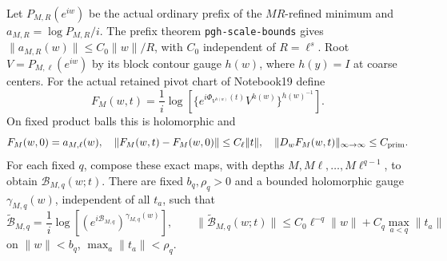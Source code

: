 \begin{proposition}
\label{mrg-block}
Let $P_{M,R}(e^{iw})$ be the actual ordinary prefix of the $MR$-refined
minimum and $a_{M,R}=\log P_{M,R}/i$. The prefix theorem
\texttt{pgh-scale-bounds} gives $\|a_{M,R}(w)\|\le C_0\|w\|/R$,
with $C_0$ independent of $R=\ell^s$.
Root $V=P_{M,\ell}(e^{iw})$ by its block contour gauge $h(w)$,
where $h(y)=I$ at coarse centers. For the actual retained pivot chart
of Notebook19 define
\begin{equation}
 F_M(w,t)=\frac1i\log\left[
       \{e^{i\Phi_{V^{h(w)}}(t)}V^{h(w)}\}^{h(w)^{-1}}\right].
 \label{mrg-chart}
\end{equation}
On fixed product balls this is holomorphic and
\begin{equation}
 F_M(w,0)=a_{M,\ell}(w),\quad
 \|F_M(w,t)-F_M(w,0)\|\le C_\ell\|t\|,\quad
 \|D_wF_M(w,t)\|_{\infty\to\infty}\le C_{\rm prim}.
 \label{mrg-primitive}
\end{equation}
For each fixed $q$, compose these exact maps, with depths
$M,M\ell,\ldots,M\ell^{q-1}$, to obtain $\mathcal B_{M,q}(w;t)$.
There are fixed $b_q,\rho_q>0$ and a bounded holomorphic gauge
$\gamma_{M,q}(w)$, independent of all $t_a$, such that
\begin{equation}
 \widetilde{\mathcal B}_{M,q}
   =\frac1i\log[(e^{i\mathcal B_{M,q}})^{\gamma_{M,q}(w)}],
 \qquad
 \|\widetilde{\mathcal B}_{M,q}(w;t)\|
       \le C_0\ell^{-q}\|w\|+C_q\max_{a<q}\|t_a\|
 \label{mrg-block-gain}
\end{equation}
on $\|w\|<b_q$, $\max_a\|t_a\|<\rho_q$.
\end{proposition}

